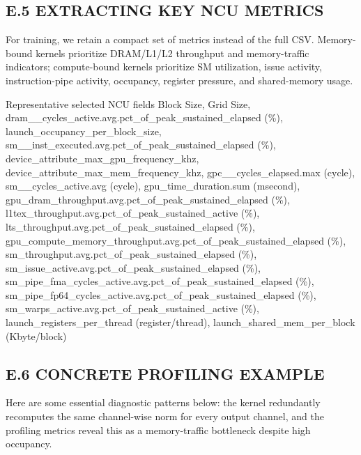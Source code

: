 \documentclass[
  10
]{article}
\newenvironment{Shaded}{}{}
\newcommand{\NormalTok}[1]{#1}
\begin{document}
\subsection{E.5 EXTRACTING KEY NCU
METRICS}\label{e.5-extracting-key-ncu-metrics}

For training, we retain a compact set of metrics instead of the full
CSV. Memory-bound kernels prioritize DRAM/L1/L2 throughput and
memory-traffic indicators; compute-bound kernels prioritize SM
utilization, issue activity, instruction-pipe activity, occupancy,
register pressure, and shared-memory usage.

\begin{Shaded}
\begin{Highlighting}[]
\NormalTok{Representative selected NCU fields}
\NormalTok{Block Size, Grid Size, dram\_\_cycles\_active.avg.pct\_of\_peak\_sustained\_elapsed (\%), launch\_occupancy\_per\_block\_size,}
\NormalTok{sm\_\_inst\_executed.avg.pct\_of\_peak\_sustained\_elapsed (\%), device\_attribute\_max\_gpu\_frequency\_khz,}
\NormalTok{device\_attribute\_max\_mem\_frequency\_khz, gpc\_\_cycles\_elapsed.max (cycle), sm\_\_cycles\_active.avg (cycle), gpu\_time\_duration.sum (msecond), gpu\_dram\_throughput.avg.pct\_of\_peak\_sustained\_elapsed (\%), l1tex\_throughput.avg.pct\_of\_peak\_sustained\_active (\%), lts\_throughput.avg.pct\_of\_peak\_sustained\_elapsed (\%), gpu\_compute\_memory\_throughput.avg.pct\_of\_peak\_sustained\_elapsed (\%), sm\_throughput.avg.pct\_of\_peak\_sustained\_elapsed (\%), sm\_issue\_active.avg.pct\_of\_peak\_sustained\_elapsed (\%), sm\_pipe\_fma\_cycles\_active.avg.pct\_of\_peak\_sustained\_elapsed (\%), sm\_pipe\_fp64\_cycles\_active.avg.pct\_of\_peak\_sustained\_elapsed (\%), sm\_warps\_active.avg.pct\_of\_peak\_sustained\_active (\%), launch\_registers\_per\_thread (register/thread), launch\_shared\_mem\_per\_block (Kbyte/block) }
\end{Highlighting}
\end{Shaded}

\subsection{E.6 CONCRETE PROFILING
EXAMPLE}\label{e.6-concrete-profiling-example}

Here are some essential diagnostic patterns below: the kernel
redundantly recomputes the same channel-wise norm for every output
channel, and the profiling metrics reveal this as a memory-traffic
bottleneck despite high occupancy.
\end{document}
